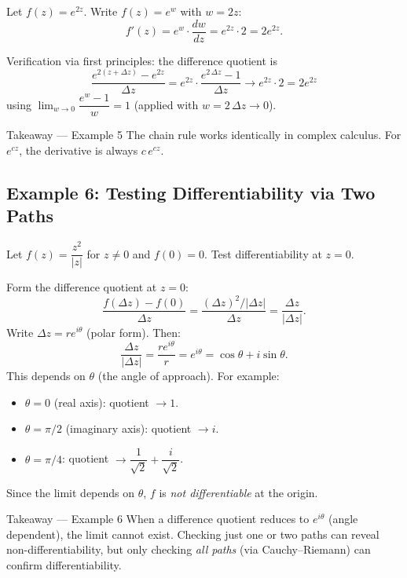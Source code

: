 \documentclass[12pt,a4paper]{article}
\begin{document}
Let $f(z) = e^{2z}$. Write $f(z) = e^{w}$ with $w = 2z$:
\[
  f'(z) = e^w \cdot \frac{dw}{dz} = e^{2z} \cdot 2 = 2e^{2z}.
\]

Verification via first principles: the difference quotient is
\[
  \frac{e^{2(z+\Delta z)} - e^{2z}}{\Delta z}
  = e^{2z}\cdot\frac{e^{2\,\Delta z}-1}{\Delta z}
  \to e^{2z} \cdot 2 = 2e^{2z}
\]
using $\lim_{w\to 0}\dfrac{e^w-1}{w} = 1$ (applied with $w = 2\,\Delta z \to 0$).

\begin{learnbox}{Takeaway --- Example 5}
The chain rule works identically in complex calculus. For $e^{cz}$,
the derivative is always $c\,e^{cz}$.
\end{learnbox}

\subsection*{Example 6: Testing Differentiability via Two Paths}

Let $f(z) = \dfrac{z^2}{|z|}$ for $z \neq 0$ and $f(0) = 0$. Test differentiability at $z = 0$.

Form the difference quotient at $z = 0$:
\[
  \frac{f(\Delta z) - f(0)}{\Delta z}
  = \frac{(\Delta z)^2 / |\Delta z|}{\Delta z}
  = \frac{\Delta z}{|\Delta z|}.
\]
Write $\Delta z = r e^{i\theta}$ (polar form). Then:
\[
  \frac{\Delta z}{|\Delta z|} = \frac{r e^{i\theta}}{r} = e^{i\theta} = \cos\theta + i\sin\theta.
\]
This depends on $\theta$ (the angle of approach). For example:
\begin{itemize}
  \item $\theta = 0$ (real axis): quotient $\to 1$.
  \item $\theta = \pi/2$ (imaginary axis): quotient $\to i$.
  \item $\theta = \pi/4$: quotient $\to \dfrac{1}{\sqrt{2}} + \dfrac{i}{\sqrt{2}}$.
\end{itemize}
Since the limit depends on $\theta$, $f$ is \emph{not differentiable} at the origin.

\begin{learnbox}{Takeaway --- Example 6}
When a difference quotient reduces to $e^{i\theta}$ (angle dependent), the limit
cannot exist. Checking just one or two paths can reveal non-differentiability,
but only checking \emph{all paths} (via Cauchy--Riemann) can confirm differentiability.
\end{learnbox}

\end{document}
